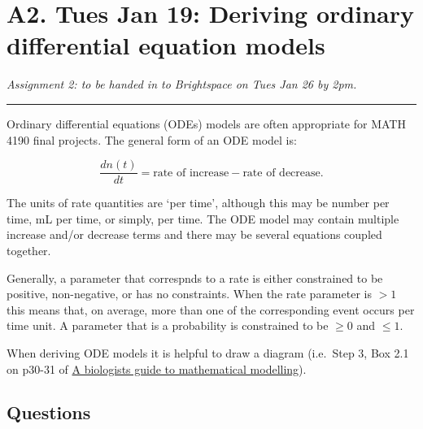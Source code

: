 \documentclass[]{book}
\begin{document}
\chapter{A2. Tues Jan 19: Deriving ordinary differential equation
models}\label{a2.-tues-jan-19-deriving-ordinary-differential-equation-models}

\emph{Assignment 2: to be handed in to Brightspace on Tues Jan 26 by
2pm.}

\begin{center}\rule{0.5\linewidth}{0.5pt}\end{center}

Ordinary differential equations (ODEs) models are often appropriate for
MATH 4190 final projects. The general form of an ODE model is:

\begin{equation}\label{eq:genCT}
\frac{dn(t)}{dt} = \mbox{rate of increase} - \mbox{rate of decrease}.
\end{equation}

The units of rate quantities are `per time', although this may be number
per time, mL per time, or simply, per time. The ODE model may contain
multiple increase and/or decrease terms and there may be several
equations coupled together.

Generally, a parameter that correspnds to a rate is either constrained
to be positive, non-negative, or has no constraints. When the rate
parameter is \(>1\) this means that, on average, more than one of the
corresponding event occurs per time unit. A parameter that is a
probability is constrained to be \(\geq 0\) and \(\leq 1\).

When deriving ODE models it is helpful to draw a diagram (i.e.~Step 3,
Box 2.1 on p30-31 of
\href{https://ebookcentral-proquest-com.qe2a-proxy.mun.ca/lib/MUN/detail.action?docID=768551}{A
biologists guide to mathematical modelling}).

\section*{Questions}\label{questions}
\end{document}
